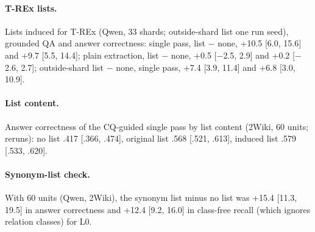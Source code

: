 \paragraph{T-REx lists.}\label{app:trexlist} Lists induced for T-REx (Qwen, 33 shards; outside-shard list one run seed), grounded QA and answer correctness: single pass, list $-$ none, +10.5 [6.0, 15.6] and +9.7 [5.5, 14.4]; plain extraction, list $-$ none, +0.5 [$-$2.5, 2.9] and +0.2 [$-$2.6, 2.7]; outside-shard list $-$ none, single pass, +7.4 [3.9, 11.4] and +6.8 [3.0, 10.9].

\paragraph{List content.}\label{app:seeddose} Answer correctness of the CQ-guided single pass by list content (2Wiki, 60 units; reruns): no list .417 [.366, .474], original list .568 [.521, .613], induced list .579 [.533, .620].

\paragraph{Synonym-list check.}\label{app:synseed} With 60 units (Qwen, 2Wiki), the synonym list minus no list was +15.4 [11.3, 19.5] in answer correctness and +12.4 [9.2, 16.0] in class-free recall (which ignores relation classes) for L0.

